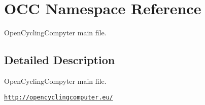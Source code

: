 \hypertarget{namespaceOCC}{}\section{O\+CC Namespace Reference}
\label{namespaceOCC}


Open\+Cycling\+Compyter main file.  




\subsection{Detailed Description}
Open\+Cycling\+Compyter main file. 

\href{http://opencyclingcomputer.eu/}{\tt http\+://opencyclingcomputer.\+eu/} 
